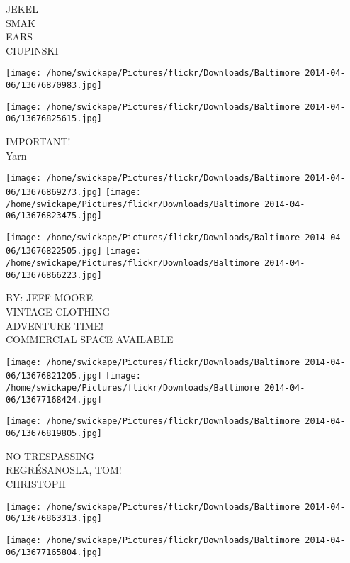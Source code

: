 \documentclass[10pt,letterpaper]{article}
\begin{document}
JEKEL\\
SMAK\\
EARS\\
CIUPINSKI\\
\pagebreak

\texttt{[image: /home/swickape/Pictures/flickr/Downloads/Baltimore 2014-04-06/13676870983.jpg]}

\vspace{0.25in}
\texttt{[image: /home/swickape/Pictures/flickr/Downloads/Baltimore 2014-04-06/13676825615.jpg]}

IMPORTANT!\\
Yarn\\
\pagebreak

\texttt{[image: /home/swickape/Pictures/flickr/Downloads/Baltimore 2014-04-06/13676869273.jpg]}
\texttt{[image: /home/swickape/Pictures/flickr/Downloads/Baltimore 2014-04-06/13676823475.jpg]}

\texttt{[image: /home/swickape/Pictures/flickr/Downloads/Baltimore 2014-04-06/13676822505.jpg]}
\texttt{[image: /home/swickape/Pictures/flickr/Downloads/Baltimore 2014-04-06/13676866223.jpg]}

BY: JEFF MOORE\\
VINTAGE CLOTHING\\
ADVENTURE TIME!\\
COMMERCIAL SPACE AVAILABLE\\
\pagebreak

\texttt{[image: /home/swickape/Pictures/flickr/Downloads/Baltimore 2014-04-06/13676821205.jpg]}
\texttt{[image: /home/swickape/Pictures/flickr/Downloads/Baltimore 2014-04-06/13677168424.jpg]}

\texttt{[image: /home/swickape/Pictures/flickr/Downloads/Baltimore 2014-04-06/13676819805.jpg]}

NO TRESPASSING\\
REGRÉSANOSLA, TOM!\\
CHRISTOPH\\
\pagebreak

\texttt{[image: /home/swickape/Pictures/flickr/Downloads/Baltimore 2014-04-06/13676863313.jpg]}

\vspace{0.25in}
\texttt{[image: /home/swickape/Pictures/flickr/Downloads/Baltimore 2014-04-06/13677165804.jpg]}
\end{document}
